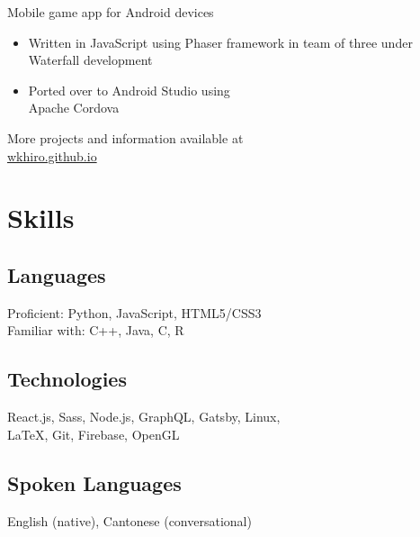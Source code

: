 \documentclass{article}
\begin{document}
\begin{paracol}{2}
{\color{NavyBlue} Mobile game app for Android devices}
\begin{itemize}[leftmargin=*]
	\itemsep0em 
	\item Written in JavaScript using Phaser framework in team of three under Waterfall development
	\item Ported over to Android Studio using 
\\\indent Apache Cordova
\end{itemize}

\vspace{0.5em}
{\noindent More projects and information available at \\
\href{https://wkhiro.github.io/}{\color{NavyBlue} wkhiro.github.io}}

\switchcolumn
\vspace{-2.5em}
\section{Skills}

\vspace{-0.5em}
\subsection{Languages} \hfill \vspace{0.5em}
	
	Proficient: Python, JavaScript, HTML5/CSS3\\
	\indent Familiar with: C++, Java, C, R
\vspace{-0.5em}
\subsection{Technologies} \hfill \vspace{0.5em}

	React.js, Sass, Node.js, GraphQL, Gatsby, Linux, \\\indent LaTeX, Git, Firebase, OpenGL
	
\vspace{-0.5em}
\subsection{Spoken Languages} \hfill \vspace{0.5em}

	English (native), Cantonese (conversational)
	

\end{paracol}
\end{document}
